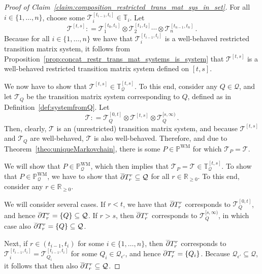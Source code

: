 \documentclass[10pt]{paper}
\theoremstyle{definition}
\newcommand{\reals}{\mathbb{R}}
\newcommand{\realsnonneg}{\reals_{\geq 0}}
\newcommand{\processes}{\mathbb{P}}
\newcommand{\wmprocesses}{\processes^{\mathrm{WM}}}
\newcommand{\rateset}{\mathcal{Q}}
\newcommand{\coloneqq}{:\!=}
\begin{document}
\begin{proof}[Proof of Claim~\ref{claim:composition_restricted_trans_mat_sys_in_set}]
For all $i\in\{1,\ldots,n\}$, choose some $\mathcal{T}_i^{[t_{i-1},t_i]}\in\mathbb{T}_i$. Let
\begin{equation*}
\mathcal{T}^{[t,s]}\coloneqq \mathcal{T}_1^{[t_{0},t_1]} \otimes \mathcal{T}_2^{[t_{1},t_2]} \cdots \otimes \mathcal{T}_n^{[t_{n-1},t_n]}\,.
\end{equation*}
Because for all $i\in\{1,\ldots,n\}$ we have that $\mathcal{T}_i^{[t_{i-1},t_i]}$ is a well-behaved restricted transition matrix system, it follows from Proposition~\ref{prop:concat_restr_trans_mat_systems_is_system} that $\mathcal{T}^{[t,s]}$ is a well-behaved restricted transition matrix system defined on $[t,s]$.

We now have to show that $\mathcal{T}^{[t,s]} \in \mathbb{T}_\rateset^{[t,s]}$. To this end, consider any $Q\in\rateset$, and let $\mathcal{T}_Q$ be the transition matrix system corresponding to $Q$, defined as in Definition~\ref{def:systemfromQ}. Let
\begin{equation*}
\mathcal{T} \coloneqq \mathcal{T}_Q^{[0,t]}\otimes \mathcal{T}^{[t,s]} \otimes \mathcal{T}_Q^{[s,\infty)}\,.
\end{equation*}
Then, clearly, $\mathcal{T}$ is an (unrestricted) transition matrix system, and because $\mathcal{T}^{[t,s]}$ and $\mathcal{T}_Q$ are well-behaved, $\mathcal{T}$ is also well-behaved. Therefore, and due to Theorem~\ref{theo:uniqueMarkovchain}, there is some $P\in\wmprocesses$ for which $\mathcal{T}_P = \mathcal{T}$.

We will show that $P\in\wmprocesses_\rateset$, which then implies that $\mathcal{T}_P = \mathcal{T}\in\mathbb{T}_\rateset^{[t,s]}$. To show that $P\in\wmprocesses_\rateset$, we have to show that $\smash{\overline{\partial}}T_r^r\subseteq\rateset$ for all $r\in\realsnonneg$. To this end, consider any $r\in\realsnonneg$.

We will consider several cases. If $r<t$, we have that $\smash{\overline{\partial}}T_r^r$ corresponds to $\mathcal{T}_Q^{[0,t]}$, and hence $\smash{\overline{\partial}}T_r^r=\{Q\}\subseteq\rateset$. If $r>s$, then $\smash{\overline{\partial}}T_r^r$ corresponds to $\mathcal{T}_Q^{[s,\infty)}$, in which case also $\smash{\overline{\partial}}T_r^r=\{Q\}\subseteq\rateset$.

Next, if $r\in(t_{i-1},t_i)$ for some $i\in\{1,\ldots,n\}$, then $\smash{\overline{\partial}}T_r^r$ corresponds to $\mathcal{T}_i^{[t_{i-1},t_i]}=\mathcal{T}_{Q_i}^{[t_{i-1},t_i]}$ for some $Q_i\in\rateset_{\epsilon'}$, and hence $\smash{\overline{\partial}}T_r^r=\{Q_i\}$. Because $\rateset_{\epsilon'}\subseteq\rateset$, it follows that then also $\smash{\overline{\partial}}T_r^r\subseteq\rateset$.


\end{proof}
\end{document}
